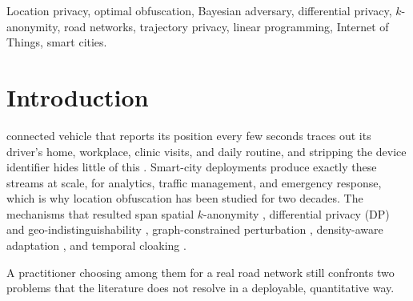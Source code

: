 \documentclass[10pt,journal,compsoc]{IEEEtran}
\begin{document}
{\begin{abstract}
in Porto) we measure the price of heuristics: at matched utility, DP and
$k$-anonymity forfeit $5$--$22\%$ of the achievable privacy in the operationally
relevant regime, whereas MIRAGE tracks the global privacy--utility frontier up to
the network's intrinsic uncertainty ceiling. The cross-city variation is consistent
with prior heterogeneity, the structure that the optimal mechanism exploits and the
heuristics ignore. Finally, we report a negative result that snapshot-optimality
does not imply trajectory-optimality: MIRAGE's scalability partition leaks region
membership, so against a sequential adversary a diffuse mechanism can be more
robust. This identifies the central open problem. The complete framework is
released for reproducibility.
\end{abstract}
\begin{IEEEkeywords}
Location privacy, optimal obfuscation, Bayesian adversary, differential privacy,
$k$-anonymity, road networks, trajectory privacy, linear programming, Internet of
Things, smart cities.
\end{IEEEkeywords}}
\maketitle
\IEEEdisplaynontitleabstractindextext
\IEEEpeerreviewmaketitle

\section{Introduction}
\label{sec:intro}
 connected vehicle that reports its position every few
seconds traces out its driver's home, workplace, clinic visits, and daily routine,
and stripping the device identifier hides little of this
\cite{sweeney2002,gruteser2003}. Smart-city deployments produce exactly these
streams at scale, for analytics, traffic management, and emergency response, which
is why location obfuscation has been studied for two decades. The mechanisms that
resulted span spatial $k$-anonymity \cite{sweeney2002,gruteser2003,mokbel2006},
differential privacy (DP) and geo-indistinguishability \cite{dwork2006,andres2013},
graph-constrained perturbation \cite{bordenabe2014}, density-aware adaptation
\cite{niu2014}, and temporal cloaking \cite{gruteser2003}.

A practitioner choosing among them for a real road network still confronts two
problems that the literature does not resolve in a deployable, quantitative way.
\end{document}
